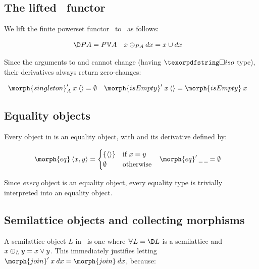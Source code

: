 \documentclass{rntz}\usepackage{fantasy}%
\begin{document}

\subsection{The lifted \pfin\ functor}
\label{sec:CP-pfin}

We lift the finite powerset functor \pfin\ to \CP\ as follows:

\nopagebreak[2]
\begin{align}
  \chgs{\pfinof A} &= \pfinof{\vals A} &
  x \upd_{\pfinof A} \dx &= x \cup \dx
  \label{eqn:CP-pfin}
\end{align}

\noindent
Since the arguments to  and  cannot change
(having $\iso$ type), their derivatives always return zero-changes:

\nopagebreak[2]
\begin{align*}
  \deriv{\morph{singleton}}_A \<x \<\tuple{} &= \emptyset &
  \deriv{\morph{isEmpty}} \<x \<\tuple{} &= \morph{isEmpty} \< x
\end{align*}


\subsection{Equality objects}
\label{sec:CP-eq}

Every object in \CP{} is an equality object, with  and its derivative
defined by:

\nopagebreak[2]
\begin{align*}
  \morph{eq}\<\tuple{x,y} &= 
  \begin{cases}
    \{\tuple{}\} & \text{if}~ x = y\\
    \emptyset & \text{otherwise}
  \end{cases}
  &
  \deriv{\morph{eq}} \<\pwild \<\pwild &= \emptyset
\end{align*}

\noindent Since \emph{every} object is an equality object, every equality type
is trivially interpreted into an equality object. 


\subsection{Semilattice objects and collecting morphisms}
\label{sec:CP-semilattice}

A semilattice object $L$ in \CP\ is one where $\vals L = \chgs L$ is a
semilattice and $x \mathbin{\oplus}_L y = x \vee y$. This immediately justifies letting
$\deriv{\morph{join}} \<x \<\dx = \morph{join}\<\dx$, because:
\end{document}
